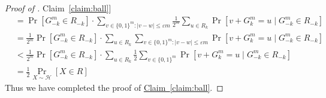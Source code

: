 \documentclass[11pt]{article}
\numberwithin{equation}{section}
\theoremstyle{definition}
\theoremstyle{plain}
\newcommand{\expref}[2]{\hyperref[#2]{#1~\ref{#2}}}
\newcommand{\Cond}{\;\Big|\;}
\newcommand{\follows}{\ensuremath{\sim}}
\newcommand{\zo}{\ensuremath{ \{ 0, 1 \} }}
\newcommand{\gap}{\ensuremath{\varepsilon}}
\begin{document}
\begin{proof}[Proof of \expref{Claim}{claim:ball}]
\begin{align*}
			&= \Pr\left[ G^m_{-k}\in R_{-k} \right]
			\cdot \sum_{v\in\zo^m: \left|v-w\right|\le \gap m }\frac{1}{2^m} \sum_{u\in R_k}\Pr\left[ v+ G^m_k = u \Cond G^m_{-k}\in R_{-k}  \right]\\
			&= \frac{1}{2^m}  \Pr\left[ G^m_{-k}\in R_{-k} \right]
			\cdot \sum_{u\in R_k} \sum_{v\in\zo^m: \left|v-w\right|\le \gap m }\Pr\left[ v+ G^m_k = u \Cond G^m_{-k}\in R_{-k}  \right]\\
			&< \frac{1}{2^m}  \Pr\left[ G^m_{-k}\in R_{-k} \right]
			\cdot \sum_{u\in R_k} \frac{1}{2}\sum_{v\in\zo^m}\Pr\left[ v+ G^m_k = u \Cond G^m_{-k}\in R_{-k}  \right]\\
			&=\frac{1}{2} \Pr_{X\follows \mathcal{H}}\left[ X\in R\right]
		\end{align*}
%
Thus we have completed the proof of \expref{Claim}{claim:ball}.
	\end{proof}

\end{document}
